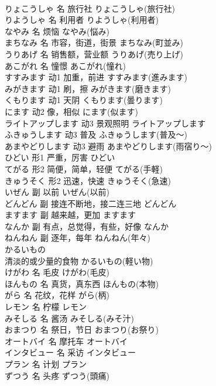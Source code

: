 \documentclass[8pt]{extreport}
\begin{document}
\begin{CJK}{UTF8}{min}
\\	りょこうしゃ	名	旅行社	りょこうしゃ(旅行社)	
\\	りようしゃ	名	利用者	りようしゃ(利用者)	
\\	なやみ	名	烦恼	なやみ(悩み)	
\\	まちなみ	名	市容，街道，街景	まちなみ(町並み)	
\\	うりあげ	名	销售额，营业额	うりあげ(売り上げ)	
\\	あこがれ	名	憧憬	あこがれ(憧れ)	
\\	すすみます	动1	加重，前进	すすみます(進みます)	
\\	みがきます	动1	刷，擦	みがきます(磨きます)	
\\	くもります	动1	天阴	くもります(曇ります)	
\\	にます	动2	像，相似	にます(似ます)	
\\	ライトアップします	动3	景观照明	ライトアップします	
\\	ふきゅうします	动3	普及	ふきゅうします(普及～)	
\\	あまやどりします	动3	避雨	あまやどりします(雨宿り～)	
\\	ひどい	形1	严重，厉害	ひどい	
\\	てがる	形2	简便，简单，轻便	てがる(手軽)	
\\	きゅうそく	形2	迅速，快速	きゅうそく(急速)	
\\	いぜん	副	以前	いぜん(以前)	
\\	どんどん	副	接连不断地，接二连三地	どんどん	
\\	ますます	副	越来越，更加	ますます	
\\	なんか	副	有点，总觉得，有些，好像	なんか	
\\	ねんねん	副	逐年，每年	ねんねん(年々)	
\\	かるいもの	
\\	清淡的或少量的食物	かるいもの(軽い物)	
\\	けがわ	名	毛皮	けがわ(毛皮)	
\\	ほんもの	名	真货，真东西	ほんもの(本物)	
\\	がら	名	花纹，花样	がら(柄)	
\\	レモン	名	柠檬	レモン	
\\	みそしる	名	酱汤	みそしる(みそ汁)	
\\	おまつり	名	祭日，节日	おまつり(お祭り)	
\\	オートバイ	名	摩托车	オートバイ	
\\	インタビュー	名	采访	インタビュー	
\\	プラン	名	计划	プラン	
\\	ずつう	名	头疼	ずつう(頭痛)	

\end{CJK}
\end{document}

